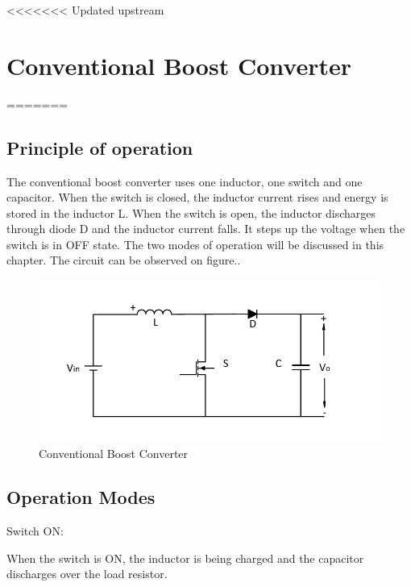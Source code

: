 <<<<<<< Updated upstream
\section{Conventional Boost Converter}\label{ch:CBC}
=======

\subsection{Principle of operation}\label{sec:POC}

The conventional boost converter uses one inductor,
one switch and one capacitor. When the switch is closed, the inductor current rises and energy is stored in the inductor L. When the switch is open, the inductor discharges through diode D and the inductor current falls. It steps up the voltage when
the switch is in OFF state. The two modes of operation will be discussed in this chapter. The circuit can be observed on figure..


\begin{figure}[H]
   \centering
   \includegraphics[width=\textwidth]{figures/aConventionalBoost/ConventionalBoostConverter.pdf}
    \caption{Conventional Boost Converter}
	\label{fig:ConventionalBoost}
\end{figure}

\subsection{Operation Modes}\label{sec:OP}

Switch ON:

When the switch is ON,
the inductor is being charged and the capacitor discharges over the load resistor.

